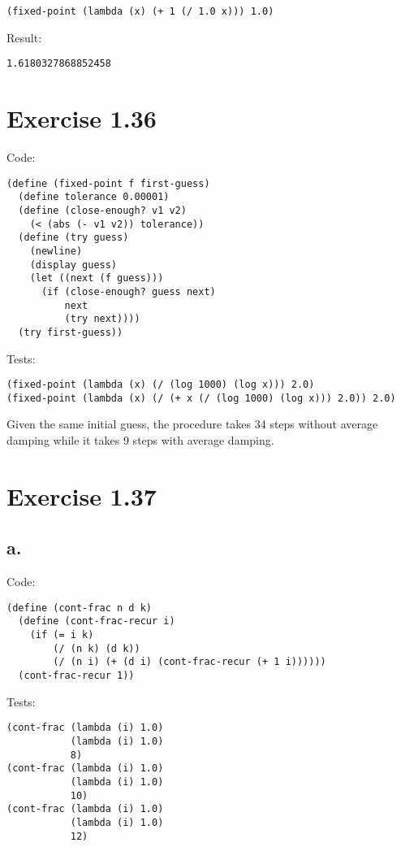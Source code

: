 \documentclass[../main.tex]{subfiles}
\begin{document}
\begin{lstlisting}
(fixed-point (lambda (x) (+ 1 (/ 1.0 x))) 1.0)
\end{lstlisting}

Result:

\begin{lstlisting}
1.6180327868852458
\end{lstlisting}

\section{Exercise 1.36}

Code:

\begin{lstlisting}
(define (fixed-point f first-guess)
  (define tolerance 0.00001)
  (define (close-enough? v1 v2)
    (< (abs (- v1 v2)) tolerance))
  (define (try guess)
    (newline)
    (display guess)
    (let ((next (f guess)))
      (if (close-enough? guess next)
          next
          (try next))))
  (try first-guess))
\end{lstlisting}

Tests:

\begin{lstlisting}
(fixed-point (lambda (x) (/ (log 1000) (log x))) 2.0)
(fixed-point (lambda (x) (/ (+ x (/ (log 1000) (log x))) 2.0)) 2.0)
\end{lstlisting}

Given the same initial guess, the procedure takes 34 steps without
 average damping while it takes 9 steps with average damping.

\section{Exercise 1.37}

\subsection*{a.}

Code:

\begin{lstlisting}
(define (cont-frac n d k)
  (define (cont-frac-recur i)
    (if (= i k)
        (/ (n k) (d k))
        (/ (n i) (+ (d i) (cont-frac-recur (+ 1 i))))))
  (cont-frac-recur 1))
\end{lstlisting}

Tests:

\begin{lstlisting}
(cont-frac (lambda (i) 1.0)
           (lambda (i) 1.0)
           8)
(cont-frac (lambda (i) 1.0)
           (lambda (i) 1.0)
           10)
(cont-frac (lambda (i) 1.0)
           (lambda (i) 1.0)
           12)
\end{lstlisting}
\end{document}

